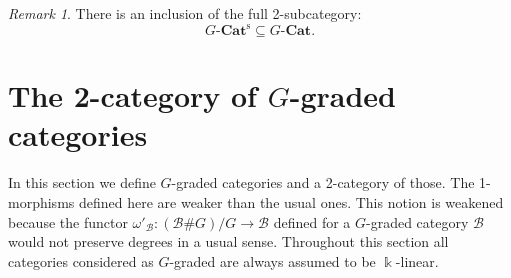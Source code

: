 \documentclass{surv-l}
\numberwithin{equation}{chapter}
\numberwithin{figure}{chapter}
\theoremstyle{plain}
\theoremstyle{definition}
\theoremstyle{remark}
\newtheorem{rmk}[thm]{Remark}
\newcommand{\GCat}{G\text{-}\mathbf{Cat}}
\newcommand{\GCats}{G\text{-}\mathbf{Cat}^{\mathrm{s}}}
\begin{document}
\begin{rmk}
There is an inclusion of the full 2-subcategory:
\[
\GCats \subseteq \GCat .
\]
\end{rmk}

\section{The 2-category of $G$-graded categories}In this section we define $G$-graded categories and a 2-category of those.
The 1-morphisms defined here are weaker than the usual ones.
This notion is weakened because the functor
$\omega'_\mathcal{B} \colon (\mathcal{B} \# G)/G \to \mathcal{B}$ defined for a $G$-graded category $\mathcal{B}$
would not preserve degrees in a usual sense.
Throughout this section all categories considered as $G$-graded are always assumed to be $\Bbbk$-linear.
\end{document}
